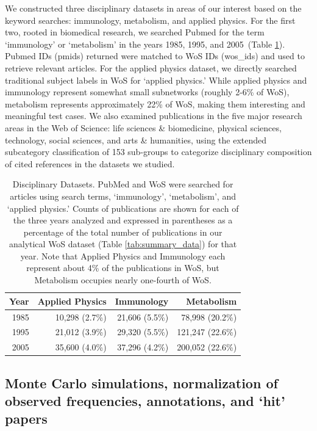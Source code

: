\documentclass[NETN]{stjour}
\begin{document}
We constructed three disciplinary datasets in areas of our interest based on the keyword searches: immunology,   metabolism, and   applied physics. For the first two, rooted in biomedical research, we searched Pubmed for the term `immunology' or `metabolism' in the years 1985, 1995, and 2005~(Table \ref{tab:disc-datasets}). Pubmed IDs (pmids) returned were matched to WoS IDs (wos\_ids) and used to retrieve relevant articles. For the applied physics dataset, we directly searched traditional subject labels in WoS for `applied physics.' While applied physics and immunology represent somewhat small subnetworks (roughly 2-6\% of WoS), metabolism represents approximately 22\% of WoS, making them interesting and meaningful test cases. We also examined publications in the five major research areas in the Web of Science: life sciences \& biomedicine, physical sciences, technology, social sciences, and arts \& humanities,  using the extended subcategory classification of 153 sub-groups to categorize disciplinary composition of cited references in the datasets we studied.
\vspace{-2 mm}
\begin{table}[ht]
\caption{Disciplinary Datasets. PubMed and WoS were searched for articles using search terms, `immunology', `metabolism', and `applied physics.' Counts of publications are shown for each of the three years analyzed and expressed in parentheses as a percentage of the total number of publications in our analytical WoS dataset (Table \ref{tab:summary_data}) for that year. Note that Applied Physics and Immunology each represent about 4\% of the publications in WoS, but Metabolism occupies nearly one-fourth of WoS.}
\label{tab:disc-datasets}
\centering
\begin{tabular}{|r r r r|}
  \hline
Year & Applied Physics & Immunology & Metabolism   \\ 
  \hline
1985 & 10,298 (2.7\%) & 21,606 (5.5\%) & 78,998 (20.2\%)  \\ 
1995 & 21,012 (3.9\%)  & 29,320 (5.5\%)  & 121,247 (22.6\%)   \\ 
2005 & 35,600 (4.0\%) & 37,296 (4.2\%) & 200,052 (22.6\%)    \\ 
 \hline
\end{tabular}
\vspace{-6mm}
\end{table}

\subsection{Monte Carlo simulations, normalization of observed frequencies, annotations, and `hit' papers}
\end{document}
